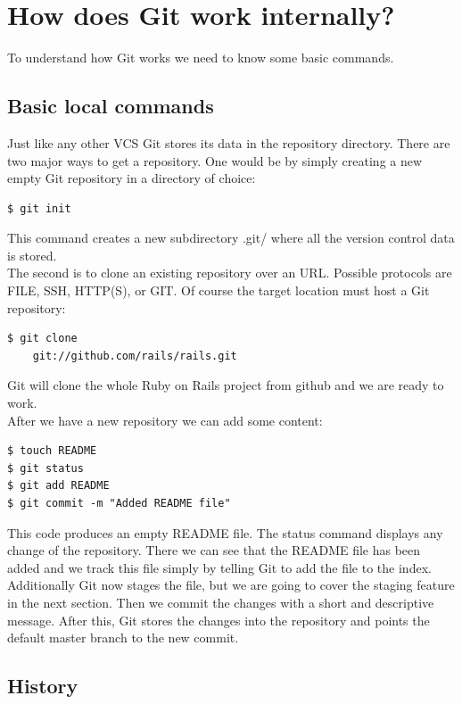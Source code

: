 \section{How does Git work internally?}\label{howdoesgitwork}

To understand how Git works we need to know some basic commands.

\subsection {Basic local commands}

Just like any other VCS Git stores its data in the repository directory.
There are two major ways to get a repository.
One would be by simply creating a new empty Git repository in a directory of choice:
\begin{lstlisting}
$ git init
\end{lstlisting}
This command creates a new subdirectory .git/ where all the version control
data is stored. \cite[page 55]{gitinternals2008} \\
The second is to clone an existing repository over an URL. Possible protocols
are FILE, SSH, HTTP(S), or GIT. Of course the target location must host a
Git repository:
\begin{lstlisting}
$ git clone 
    git://github.com/rails/rails.git
\end{lstlisting}
Git will clone the whole Ruby on Rails project from github and we are
ready to work. \cite[page 56]{gitinternals2008} \\

After we have a new repository we can add some content:
\begin{lstlisting}
$ touch README
$ git status
$ git add README
$ git commit -m "Added README file"
\end{lstlisting}

This code produces an empty README file. The status command displays any change
of the repository. There we can see that the README file has been added and we
track this file simply by telling Git to add the file to the index. Additionally
Git now stages the file, but we are going to cover the staging feature in the next
section. Then we commit the changes with a short and descriptive message. After
this, Git stores the changes into the repository and points the default master
branch to the new commit. \cite[page 55]{gitinternals2008} \\

\subsection {History}

